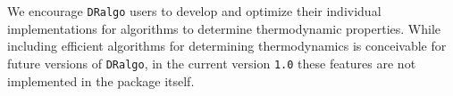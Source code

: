 \documentclass[11pt]{article}
\def\dralgo{{\tt DRalgo}}
\newcommand{\DRalgoVersion}{{\tt 1.0}}
\begin{document}
We encourage \dralgo{} users to develop and optimize their
individual implementations for algorithms to determine thermodynamic properties.
While
including efficient algorithms for determining thermodynamics is conceivable
for future versions of \dralgo{},
in the current version \DRalgoVersion{}
these features are not implemented in the package itself.

{\small
%


%
%
%
%
%
%
%
%
}
\end{document}
